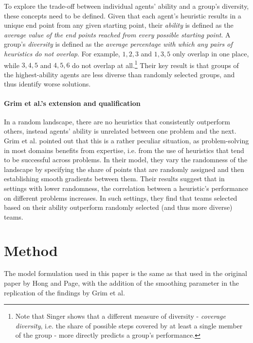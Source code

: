 To explore the trade-off between individual agents' ability and a group's diversity, these concepts need to be defined. Given that each agent's heuristic results in a unique end point from any given starting point, their \emph{ability} is defined as the \emph{average value of the end points reached from every possible starting point}. A group's \emph{diversity} is defined as the \emph{average percentage with which any pairs of heuristics do not overlap}. For example, $1, 2, 3$ and $1, 3, 5$ only overlap in one place, while $3, 4, 5$ and $4, 5, 6$ do not overlap at all.\footnote{Note that Singer\supercite{singer2019diversity} shows that a different measure of diversity - \emph{coverage diversity}, i.e. the share of possible steps covered by at least a single member of the group - more directly predicts a group's performance.} Their key result is that groups of the highest-ability agents are less diverse than randomly selected groups, and thus identify worse solutions.

\subsubsection{Grim et al.'s extension and qualification}

In a random landscape, there are no heuristics that consistently outperform others, instead agents' ability is unrelated between one problem and the next. Grim et al.\supercite{grim_diversity_2019} pointed out that this is a rather peculiar situation, as problem-solving in most domains benefits from expertise, i.e. from the use of heuristics that tend to be successful across problems. In their model, they vary the randomness of the landscape by specifying the share of points that are randomly assigned and then establishing smooth gradients between them. Their results suggest that in settings with lower randomness, the correlation between a heuristic's performance on different problems increases. In such settings, they find that teams selected based on their ability outperform randomly selected (and thus more diverse) teams.

\chapter{Method}

The model formulation used in this paper is the same as that used in the original paper by Hong and Page, with the addition of the smoothing parameter in the replication of the findings by Grim et al.

